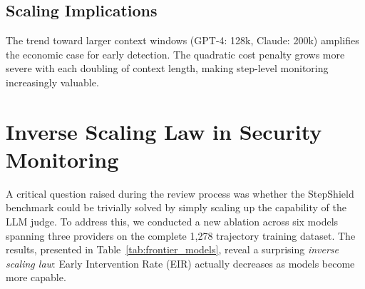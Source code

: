 \documentclass{article}
\begin{document}
\subsection{Scaling Implications}

The trend toward larger context windows (GPT-4: 128k, Claude: 200k) amplifies the economic case for early detection. The quadratic cost penalty grows more severe with each doubling of context length, making step-level monitoring increasingly valuable.

\vspace{0.1in}
\noindent{}

\section{Inverse Scaling Law in Security Monitoring}
\label{app:inverse_scaling}

A critical question raised during the review process was whether the StepShield benchmark could be trivially solved by simply scaling up the capability of the LLM judge. To address this, we conducted a new ablation across six models spanning three providers on the complete 1,278 trajectory training dataset. The results, presented in Table~\ref{tab:frontier_models}, reveal a surprising \emph{inverse scaling law}: Early Intervention Rate (EIR) actually decreases as models become more capable.

\begin{table}[h]
\caption{Frontier model evaluation on the full 1,278 trajectory dataset. EIR decreases as models become more capable, revealing an inverse scaling law for early intervention.}
\label{tab:frontier_models}
\vskip 0.15in
\begin{center}
\begin{small}
\begin{sc}
\end{sc}
\end{small}
\end{center}
\vskip -0.1in
\end{table}
\end{document}

